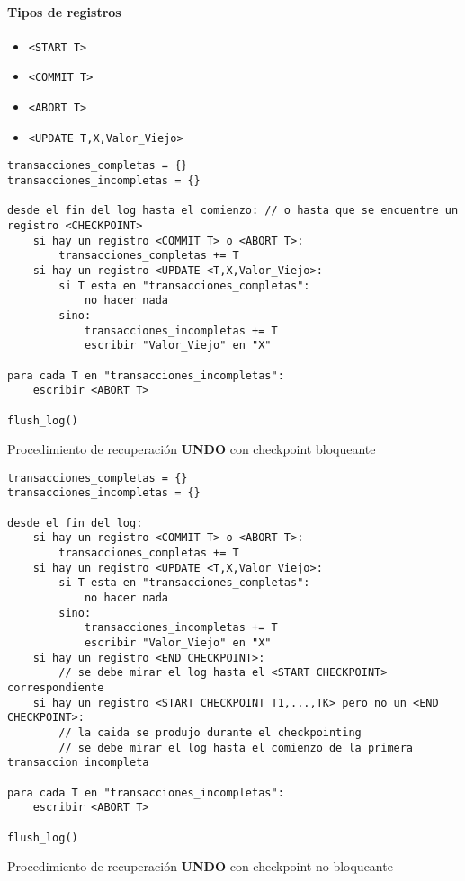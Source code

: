 \documentclass[a4paper, twoside]{article}
\begin{document}
\paragraph{Tipos de registros}
\begin{itemize}
	\item \texttt{<START T>}
	\item \texttt{<COMMIT T>}
	\item \texttt{<ABORT T>}
	\item \texttt{<UPDATE T,X,Valor\_Viejo>}
\end{itemize}

\begin{algorithm}[H]
	\begin{lstlisting}
transacciones_completas = {}
transacciones_incompletas = {}

desde el fin del log hasta el comienzo: // o hasta que se encuentre un registro <CHECKPOINT>
	si hay un registro <COMMIT T> o <ABORT T>:
		transacciones_completas += T
	si hay un registro <UPDATE <T,X,Valor_Viejo>:
		si T esta en "transacciones_completas":
			no hacer nada
		sino:
			transacciones_incompletas += T
			escribir "Valor_Viejo" en "X"

para cada T en "transacciones_incompletas":
	escribir <ABORT T>

flush_log()
	\end{lstlisting}
	\caption{Procedimiento de recuperación \textbf{UNDO }con checkpoint bloqueante}
\end{algorithm}

\begin{algorithm}[H]
	\begin{lstlisting}
transacciones_completas = {}
transacciones_incompletas = {}

desde el fin del log: 
	si hay un registro <COMMIT T> o <ABORT T>:
		transacciones_completas += T
	si hay un registro <UPDATE <T,X,Valor_Viejo>:
		si T esta en "transacciones_completas":
			no hacer nada
		sino:
			transacciones_incompletas += T
			escribir "Valor_Viejo" en "X"
	si hay un registro <END CHECKPOINT>:
		// se debe mirar el log hasta el <START CHECKPOINT> correspondiente
	si hay un registro <START CHECKPOINT T1,...,TK> pero no un <END CHECKPOINT>:
		// la caida se produjo durante el checkpointing
		// se debe mirar el log hasta el comienzo de la primera transaccion incompleta

para cada T en "transacciones_incompletas":
	escribir <ABORT T>

flush_log()
	\end{lstlisting}
	\caption{Procedimiento de recuperación \textbf{UNDO }con checkpoint no bloqueante}
\end{algorithm}
		
\end{document}
